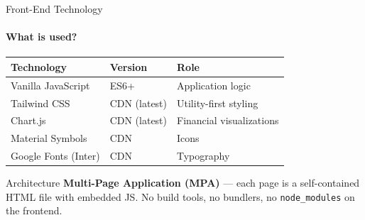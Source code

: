 \documentclass[aspectratio=169, 12pt]{beamer}
\begin{document}
\begin{frame}[shrink=4]{Front-End Technology}
\framesubtitle{What is used?}
\small
\begin{center}
\begin{tabular}{l l l}
\toprule
\textbf{Technology} & \textbf{Version} & \textbf{Role} \\
\midrule
Vanilla JavaScript & ES6+ & Application logic \\
Tailwind CSS & CDN (latest) & Utility-first styling \\
Chart.js & CDN (latest) & Financial visualizations \\
Material Symbols & CDN & Icons \\
Google Fonts (Inter) & CDN & Typography \\
\bottomrule
\end{tabular}
\end{center}

\vspace{6pt}
\begin{block}{Architecture}
\textbf{Multi-Page Application (MPA)} --- each page is a self-contained HTML file with embedded JS. No build tools, no bundlers, no \texttt{node\_modules} on the frontend.
\end{block}
\end{frame}
\end{document}
